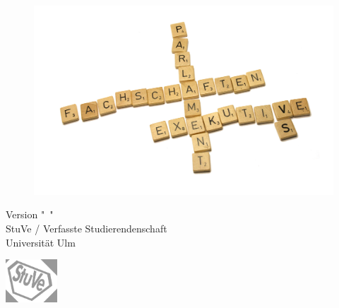 

\thispagestyle{empty}

%
%

\begin{titlepage}

\null
\vfill

\begin{center}
	\Huge\bfseries\singlespacing{\makeatletter\@title\makeatother}
\end{center}

\begin{figure}[tbph]
\centering
\includegraphics[trim = 600px 0 600px 0, width = \linewidth]{./grafiken/VS_Scrabble-mod.jpg}
\end{figure}

\null
\vfill

\begin{center}
	\begin{minipage}{\textwidth}
	\begin{minipage}[b][2cm]{0.79\textwidth}
		\begin{flushleft}
			Version \the\year"~\leadingzero{\month}"~\leadingzero{\day}\\
			\vspace{0.5\baselineskip}
			StuVe / Verfasste Studierendenschaft\\
			Universität Ulm
		\end{flushleft}
	\end{minipage}
	\begin{minipage}[b][2cm]{0.2\textwidth}
		\begin{flushright}
			\includegraphics[height=1.6cm]{./grafiken/stuve_logo_gedreht-leicht_grau.png}
		\end{flushright}
	\end{minipage}
\end{minipage}
\end{center}

\end{titlepage}

